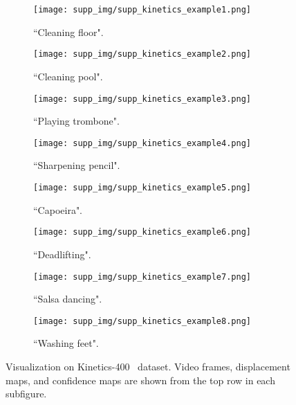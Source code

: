 \documentclass[runningheads]{llncs}
\begin{document}
\clearpage
\begin{figure*}[t]
    \centering
    \begin{subfigure}[t]{0.49\columnwidth}
    \texttt{[image: supp\_img/supp\_kinetics\_example1.png]}
    \caption{``Cleaning floor".}
    \label{fig:s4a}
    \end{subfigure}
    \begin{subfigure}[t]{0.49\columnwidth}
    \texttt{[image: supp\_img/supp\_kinetics\_example2.png]}
    \caption{``Cleaning pool".}
    \label{fig:s4b}
    \end{subfigure}
    \begin{subfigure}[t]{0.49\columnwidth}
    \texttt{[image: supp\_img/supp\_kinetics\_example3.png]}
    \caption{``Playing trombone".}
    \label{fig:s4c}
    \end{subfigure}
    \begin{subfigure}[t]{0.49\columnwidth}
    \texttt{[image: supp\_img/supp\_kinetics\_example4.png]}
    \caption{``Sharpening pencil".}
    \label{fig:s4d}
    \end{subfigure}
    \begin{subfigure}[t]{0.49\columnwidth}
    \texttt{[image: supp\_img/supp\_kinetics\_example5.png]}
    \caption{``Capoeira".}
    \label{fig:s4e}
    \end{subfigure}
    \begin{subfigure}[t]{0.49\columnwidth}
    \texttt{[image: supp\_img/supp\_kinetics\_example6.png]}
    \caption{``Deadlifting".}
    \label{fig:s4f}
    \end{subfigure}
    \begin{subfigure}[t]{0.49\columnwidth}
    \texttt{[image: supp\_img/supp\_kinetics\_example7.png]}
    \caption{``Salsa dancing".}
    \label{fig:s4g}
    \end{subfigure}
    \begin{subfigure}[t]{0.49\columnwidth}
    \texttt{[image: supp\_img/supp\_kinetics\_example8.png]}
    \caption{``Washing feet".}
    \label{fig:s4h}
    \end{subfigure}
\caption{Visualization on Kinetics-400~\cite{kay2017kinetics} dataset. Video frames, displacement maps, and confidence maps are shown from the top row in each subfigure.} \label{fig:s4}
\end{figure*}

 
\end{document}
